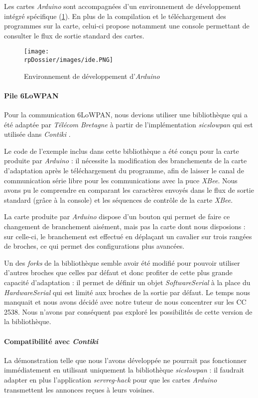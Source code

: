 Les cartes \emph{Arduino} sont accompagnées d’un environnement de développement intégré spécifique (\cref{arduino-ide}).
En plus de la compilation et le téléchargement des programmes sur la carte, celui-ci propose notamment une console permettant de consulter le flux de sortie standard des cartes.

\begin{figure}[H]
\centering
\texttt{[image: \\rpDossier/images/ide.PNG]}
\caption{Environnement de développement d’\emph{Arduino}}
\label{arduino-ide}
\end{figure}

\paragraph{Pile 6LoWPAN}

Pour la communication 6LoWPAN, nous devions utiliser une bibliothèque qui a été adaptée par \emph{Télécom Bretagne} à partir de l’implémentation \emph{sicslowpan} qui est utilisée dans \emph{Contiki} .

Le code de l’exemple inclus dans cette bibliothèque a été conçu pour la carte produite par \emph{Arduino} : il nécessite la modification des branchements de la carte d’adaptation après le téléchargement du programme, afin de laisser le canal de communication série libre pour les communications avec la puce \emph{XBee}.
Nous avons pu le comprendre en comparant les caractères envoyés dans le flux de sortie standard (grâce à la console) et les séquences de contrôle de la carte \emph{XBee}.

La carte produite par \emph{Arduino} dispose d’un bouton qui permet de faire ce changement de branchement aisément, mais pas la carte dont nous disposions : sur celle-ci, le branchement est effectué en déplaçant un cavalier sur trois rangées de broches,  ce qui permet des configurations plus avancées.

Un des \textit{forks} de la bibliothèque  semble avoir été modifié pour pouvoir utiliser d’autres broches que celles par défaut et donc profiter de cette plus grande capacité d’adaptation : il permet de définir un objet \textit{SoftwareSerial} à la place du \textit{HardwareSerial} qui est limité aux broches de la sortie par défaut.
Le temps nous manquait et nous avons décidé avec notre tuteur de nous concentrer sur les CC 2538.
Nous n’avons par conséquent pas exploré les possibilités de cette version de la bibliothèque.

\paragraph{Compatibilité avec \emph{Contiki}}

La démonstration telle que nous l’avons développée ne pourrait pas fonctionner immédiatement en utilisant uniquement la bibliothèque \emph{sicslowpan} : il faudrait adapter en plus l’application \textit{servreg-hack} pour que les cartes \emph{Arduino} transmettent les annonces reçues à leurs voisines.
